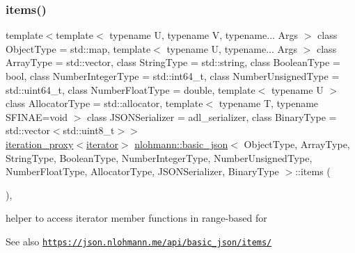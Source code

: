 \subsubsection{\texorpdfstring{items()}{items()}\hspace{0.1cm}{\footnotesize\ttfamily [1/2]}}
{\footnotesize\ttfamily template$<$template$<$ typename U, typename V, typename... Args $>$ class Object\+Type = std\+::map, template$<$ typename U, typename... Args $>$ class Array\+Type = std\+::vector, class String\+Type  = std\+::string, class Boolean\+Type  = bool, class Number\+Integer\+Type  = std\+::int64\+\_\+t, class Number\+Unsigned\+Type  = std\+::uint64\+\_\+t, class Number\+Float\+Type  = double, template$<$ typename U $>$ class Allocator\+Type = std\+::allocator, template$<$ typename T, typename S\+F\+I\+N\+A\+E=void $>$ class J\+S\+O\+N\+Serializer = adl\+\_\+serializer, class Binary\+Type  = std\+::vector$<$std\+::uint8\+\_\+t$>$$>$ \\
\hyperlink{classnlohmann_1_1detail_1_1iteration__proxy}{iteration\+\_\+proxy}$<$\hyperlink{classnlohmann_1_1basic__json_aa549b2b382916b3baafb526e5cb410bd}{iterator}$>$ \hyperlink{classnlohmann_1_1basic__json}{nlohmann\+::basic\+\_\+json}$<$ Object\+Type, Array\+Type, String\+Type, Boolean\+Type, Number\+Integer\+Type, Number\+Unsigned\+Type, Number\+Float\+Type, Allocator\+Type, J\+S\+O\+N\+Serializer, Binary\+Type $>$\+::items (\begin{DoxyParamCaption}{ }\end{DoxyParamCaption})\hspace{0.3cm}{\ttfamily [inline]}, {\ttfamily [noexcept]}}



helper to access iterator member functions in range-\/based for 

\begin{DoxySeeAlso}{See also}
\href{https://json.nlohmann.me/api/basic_json/items/}{\tt https\+://json.\+nlohmann.\+me/api/basic\+\_\+json/items/} 
\end{DoxySeeAlso}
\mbox{\label{classnlohmann_1_1basic__json_a4faaed730a81347f2f01e93f37c73823}} 
